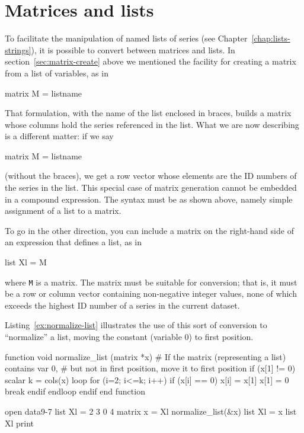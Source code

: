 \section{Matrices and lists}
\label{matrix-and-list}

To facilitate the manipulation of named lists of series (see
Chapter~\ref{chap:lists-strings}), it is possible to convert between
matrices and lists.  In section~\ref{sec:matrix-create} above we mentioned
the facility for creating a matrix from a list of variables, as in
%
\begin{code}
matrix M = { listname }
\end{code}
%
That formulation, with the name of the list enclosed in braces, builds
a matrix whose columns hold the series referenced in the list.
What we are now describing is a different matter: if we say
%
\begin{code}
matrix M = listname
\end{code}
%
(without the braces), we get a row vector whose elements are
the ID numbers of the series in the list.  This special case
of matrix generation cannot be embedded in a compound
expression.  The syntax must be as shown above, namely simple
assignment of a list to a matrix.

To go in the other direction, you can include a matrix on the
right-hand side of an expression that defines a list, as in
%
\begin{code}
list Xl = M
\end{code}
%
where \texttt{M} is a matrix.  The matrix must be suitable for
conversion; that is, it must be a row or column vector containing
non-negative integer values, none of which exceeds the highest ID
number of a series in the current dataset.

Listing~\ref{ex:normalize-list} illustrates the use of this sort of
conversion to ``normalize'' a list, moving the constant (variable 0)
to first position.

\begin{script}[htbp]
\begin{scode}
function void normalize_list (matrix *x)
  # If the matrix (representing a list) contains var 0,
  # but not in first position, move it to first position
  if (x[1] != 0)
     scalar k = cols(x)
     loop for (i=2; i<=k; i++)
        if (x[i] == 0)
            x[i] = x[1]
            x[1] = 0
            break
         endif
     endloop
  endif
end function

open data9-7
list Xl = 2 3 0 4
matrix x = Xl
normalize_list(&x)
list Xl = x
list Xl print
\end{scode}
\end{script}


